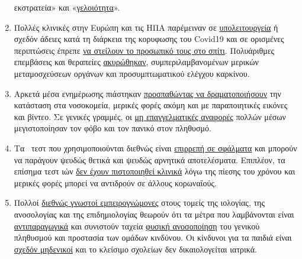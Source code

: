 \begin{enumerate}
  εκστρατεία» και
  «\href{https://www.aerztezeitung.de/Politik/Montgomery-haelt-Maskenpflicht-fuer-falsch-408844.html}{γελοιότητα}».
\item
  Πολλές κλινικές στην Ευρώπη και τις ΗΠΑ παρέμειναν σε
  \href{https://www.hsj.co.uk/acute-care/nhs-hospitals-have-four-times-more-empty-beds-than-normal/7027392.article}{υπολειτουργεία}
  ή σχεδόν άδειες κατά τη διάρκεια της κορυφωσης του Covid19 και σε
  ορισμένες περιπτώσεις έπρεπε
  \href{https://www.usatoday.com/story/news/health/2020/04/02/coronavirus-pandemic-jobs-us-health-care-workers-furloughed-laid-off/5102320002/}{να
  στείλουν το προσωπικό τους στο σπίτι}. Πολυάριθμες επεμβάσεις και
  θεραπείες
  \href{https://www.sfchronicle.com/bayarea/article/Stanford-hospital-system-to-cut-pay-20-furlough-15227591.php}{ακυρώθηκαν},
  συμπεριλαμβανομένων μερικών μεταμοσχεύσεων οργάνων και
  προσυμπτωματικού ελέγχου καρκίνου.
\item
  Αρκετά μέσα ενημέρωσης πιάστηκαν
  \href{https://nypost.com/2020/04/01/cbs-admits-to-using-footage-from-italy-in-report-about-nyc/}{προσπαθώντας
  να δραματοποιήσουν} την κατάσταση στα νοσοκομεία, μερικές φορές ακόμη
  και με παραποιητικές εικόνες και βίντεο. Σε γενικές γραμμές, οι
  \href{https://onlinelibrary.wiley.com/doi/full/10.1111/eci.13222}{μη
  επαγγελματικές αναφορές} πολλών μέσων μεγιστοποίησαν τον φόβο και τον
  πανικό στον πληθυσμό.
\item
  Τα~ τεστ που χρησιμοποιούνται διεθνώς είναι
  \href{https://www.ncbi.nlm.nih.gov/pubmed/32219885}{επιρρεπή σε
  σφάλματα} και μπορούν να παράγουν ψευδώς θετικά και ψευδώς αρνητικά
  αποτελέσματα. Επιπλέον, τα επίσημα τεστ ιών
  \href{https://www.youtube.com/watch?v=p_AyuhbnPOI}{δεν έχουν
  πιστοποιηθεί κλινικά} λόγω της πίεσης του χρόνου και μερικές φορές
  μπορεί να αντιδρούν σε άλλους κορωναϊούς.
\item
  Πολλοί
  \href{https://off-guardian.org/2020/03/24/12-experts-questioning-the-coronavirus-panic/}{διεθνώς
  γνωστοί εμπειρογνώμονες} στους τομείς της ιολογίας, της ανοσολογίας
  και της επιδημιολογίας θεωρούν ότι τα μέτρα που λαμβάνονται είναι
  \href{https://off-guardian.org/2020/03/28/10-more-experts-criticising-the-coronavirus-panic/}{αντιπαραγωγικά}
  και συνιστούν ταχεία
  \href{https://off-guardian.org/2020/04/17/8-more-experts-questioning-the-coronavirus-panic/}{φυσική
  ανοσοποίηση} του γενικού πληθυσμού και προστασία των ομάδων κινδύνου.
  Οι κίνδυνοι για τα παιδιά είναι
  \href{https://www.thelancet.com/journals/lanchi/article/PIIS2352-4642(20)30095-X/fulltext}{σχεδόν
  μηδενικοί} και το κλείσιμο σχολείων δεν δικαιολογείται ιατρικά.

\end{enumerate}
